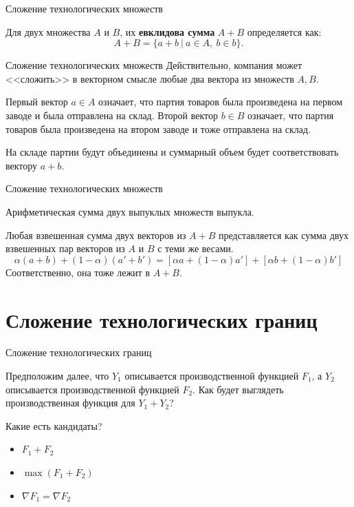 \documentclass{beamer}
\begin{document}
\begin{frame}{Сложение технологических множеств}

\begin{definition}
Для двух множества $A$ и $B$, их \textbf{евклидова сумма} $A+B$ определяется как:
$$ A+B = \{a + b \ | \ a \in A, \ b \in b\}.$$
\end{definition}
\end{frame}

\begin{frame}{Сложение технологических множеств}
Действительно, компания может <<сложить>> в векторном смысле любые два вектора из множеств $A, B$. 

Первый вектор $a \in A$ означает, что партия товаров была произведена на первом заводе и была отправлена на склад. Второй вектор $b \in B$ означает, что партия товаров была произведена на втором заводе и тоже отправлена на склад. 

На складе партии будут объединены и суммарный объем будет соответствовать вектору $a + b$.
\end{frame}

\begin{frame}{Сложение технологических множеств}
\begin{lemma}
Арифметическая сумма двух выпуклых множеств выпукла.
\end{lemma}
Любая взвешенная сумма двух векторов из $A+B$ представляется как сумма двух взвешенных пар векторов из $A$ и $B$ с теми же весами.
$$ \alpha(a + b) + (1-\alpha)(a'+b') = [\alpha a + (1-\alpha) a'] + [\alpha b + (1-\alpha) b']$$
Соответственно, она тоже лежит в $A + B$.
\end{frame}

\section{Сложение технологических границ}

\begin{frame}{Сложение технологических границ}

Предположим далее, что $Y_1$ описывается производственной функцией $F_1$, а $Y_2$ описывается производственной функцией $F_2$. Как будет выглядеть производственная функция для $Y_1 + Y_2$?

Какие есть кандидаты?
\begin{itemize}
  \item $F_1 + F_2$
  \item $\max(F_1 + F_2)$
  \item $\nabla F_1 = \nabla F_2$
\end{itemize}

\end{frame}
\end{document}
